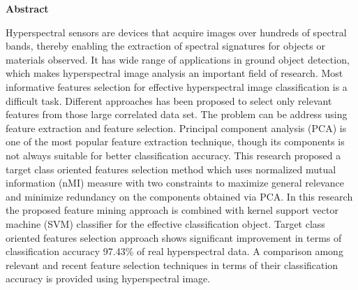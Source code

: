 \documentclass[document.tex]{subfiles}
\begin{document}
	\begin{center}
		\textbf{{\fontsize{16pt}{18}\selectfont Abstract}}
		\vspace{1cm}
	\end{center}
	Hyperspectral sensors are devices that acquire images over hundreds of spectral bands, thereby enabling the extraction of spectral signatures for objects or materials observed. It has wide range of applications in ground object detection, which makes hyperspectral image analysis an important field of research. Most informative features selection for effective hyperspectral image classification is a difficult task. Different approaches has been proposed to select only relevant features from those large correlated data set. The problem can be address using feature extraction and feature selection. Principal component analysis (PCA) is one of the most popular feature extraction technique, though its components is not always suitable for better classification accuracy. This research proposed a target class oriented features selection method which uses normalized mutual information (nMI) measure with two constraints to maximize general relevance and minimize redundancy on the components obtained via PCA. In this research the proposed feature mining approach is combined with kernel support vector machine (SVM) classifier for the effective classification object. Target class oriented features selection approach shows significant improvement in terms of classification accuracy 97.43\% of real hyperspectral data. A comparison among relevant and recent feature selection techniques in terms of their classification accuracy  is provided using hyperspectral image.

	\clearpage
	
\end{document}
